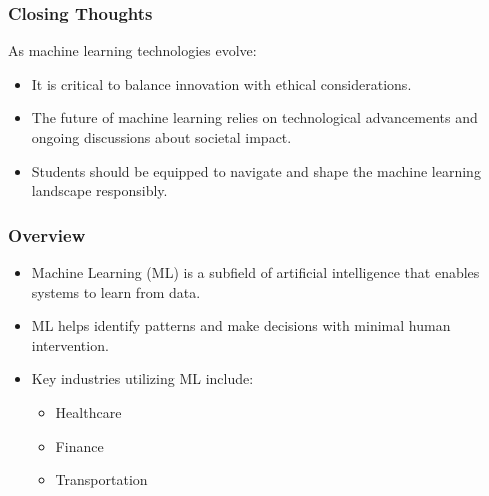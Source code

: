 \documentclass[aspectratio=169]{beamer}
\begin{document}
\begin{frame}[fragile]
    \frametitle{Closing Thoughts}
    As machine learning technologies evolve:
    \begin{itemize}
        \item It is critical to balance innovation with ethical considerations.
        \item The future of machine learning relies on technological advancements and ongoing discussions about societal impact.
        \item Students should be equipped to navigate and shape the machine learning landscape responsibly.
    \end{itemize}
\end{frame}

\begin{frame}[fragile]
    \frametitle{Overview}
    \begin{itemize}
        \item Machine Learning (ML) is a subfield of artificial intelligence that enables systems to learn from data.
        \item ML helps identify patterns and make decisions with minimal human intervention.
        \item Key industries utilizing ML include:
        \begin{itemize}
            \item Healthcare
            \item Finance
            \item Transportation
        \end{itemize}
    \end{itemize}
\end{frame}
\end{document}
